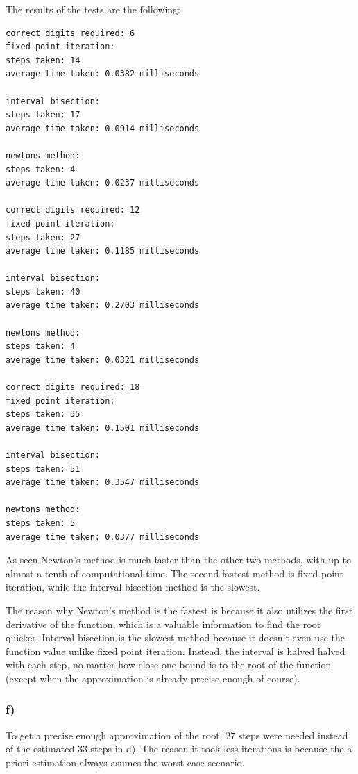 The results of the tests are the following:

\begin{lstlisting}[caption=Result of 4.8 e), keywordstyle=\color{black}]
correct digits required: 6
fixed point iteration:
steps taken: 14
average time taken: 0.0382 milliseconds

interval bisection:
steps taken: 17
average time taken: 0.0914 milliseconds

newtons method:
steps taken: 4
average time taken: 0.0237 milliseconds

correct digits required: 12
fixed point iteration:
steps taken: 27
average time taken: 0.1185 milliseconds

interval bisection:
steps taken: 40
average time taken: 0.2703 milliseconds

newtons method:
steps taken: 4
average time taken: 0.0321 milliseconds

correct digits required: 18
fixed point iteration:
steps taken: 35
average time taken: 0.1501 milliseconds

interval bisection:
steps taken: 51
average time taken: 0.3547 milliseconds

newtons method:
steps taken: 5
average time taken: 0.0377 milliseconds
\end{lstlisting}

As seen Newton's method is much faster than the other two methods, with up to almost a tenth of computational time. The second fastest method is fixed point iteration, while the interval bisection method is the slowest.

The reason why Newton's method is the fastest is because it also utilizes the first derivative of the function, which is a valuable information to find the root quicker. Interval bisection is the slowest method because it doesn't even use the function value unlike fixed point iteration. Instead, the interval is halved halved with each step, no matter how close one bound is to the root of the function (except when the approximation is already precise enough of course).


\subsubsection{f)}

To get a precise enough approximation of the root, 27 steps were needed instead of the estimated 33 steps in d). The reason it took less iterations is because the a priori estimation always asumes the worst case scenario.

